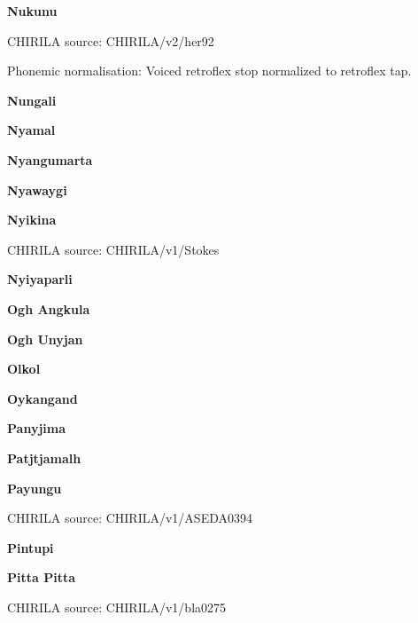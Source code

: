 \newpage


\textbf{Nukunu}

CHIRILA source: CHIRILA/v2/her92


Phonemic normalisation: Voiced retroflex stop normalized to retroflex
tap.

\textbf{Nungali}


\textbf{Nyamal}


\textbf{Nyangumarta}


\textbf{Nyawaygi}


\textbf{Nyikina}

CHIRILA source: CHIRILA/v1/Stokes


\textbf{Nyiyaparli}


\textbf{Ogh Angkula}


\textbf{Ogh Unyjan}


\textbf{Olkol}


\textbf{Oykangand}


\textbf{Panyjima}


\textbf{Patjtjamalh}


\textbf{Payungu}

CHIRILA source: CHIRILA/v1/ASEDA0394


\textbf{Pintupi}


\textbf{Pitta Pitta}

CHIRILA source: CHIRILA/v1/bla0275


